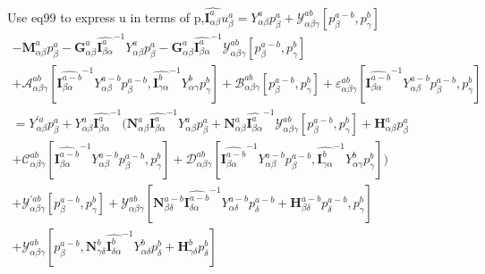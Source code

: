 \documentclass{Note}
\begin{document}
Use eq99 to express u in terms of p,$\widehat{\textbf{I}_{\alpha\beta}^a}  u_{\beta}^a=Y_{\alpha\beta}^a p_{\beta}^a+\mathcal{Y}_{\alpha\beta\gamma}^{ab}[p_{\beta}^{a-b},p_{\gamma}^{b}]$
 \begin{equation}
\begin{aligned}
-\textbf{M}_{\alpha\beta}^a p_\beta^a - \textbf{G}_{\alpha\beta}^a  {\widehat{\textbf{I}_{\beta \alpha}^a}}^{-1}  Y_{\alpha\beta}^a p_\beta^a- \textbf{G}_{\alpha\beta}^a  {\widehat{\textbf{I}_{\beta \alpha}^a}}^{-1} \mathcal{Y}_{\alpha\beta\gamma}^{ab}[p_{\beta}^{a-b},p_{\gamma}^{b}] \\
+\mathcal{A}_{\alpha\beta\gamma}^{ab}[{\widehat{\textbf{I}_{\beta \alpha}^{a-b}}}^{-1}  Y_{\alpha\beta}^{a-b} p_\beta^{a-b},{\widehat{\textbf{I}_{\gamma \alpha}^{b}}}^{-1}  Y_{\alpha\gamma}^{b} p_\gamma^{b}]+\mathcal{B}_{\alpha\beta\gamma}^{ab}[p_{\beta}^{a-b},p_{\gamma}^{b}]+\varepsilon_{\alpha\beta\gamma}^{ab}[{\widehat{\textbf{I}_{\beta \alpha}^{a-b}}}^{-1}  Y_{\alpha\beta}^{a-b} p_\beta^{a-b} ,p_{\gamma}^{b}]\\
={Y}_{\alpha\beta}^{'a} p_{\beta}^a 
+Y_{\alpha\beta}^{a} {\widehat{\textbf{I}_{\beta \alpha}^a}}^{-1}  (\textbf{N}_{\alpha\beta}^a   {\widehat{\textbf{I}_{\beta \alpha}^a}}^{-1}  Y_{\alpha\beta}^a p_\beta^a+\textbf{N}_{\alpha\beta}^a {\widehat{\textbf{I}_{\beta \alpha}^a}}^{-1} \mathcal{Y}_{\alpha\beta\gamma}^{ab}[p_{\beta}^{a-b},p_{\gamma}^{b}] +\textbf{H}_{\alpha\beta}^a p_\beta^a\\
+\mathcal{C}_{\alpha\beta\gamma}^{ab}[{\widehat{\textbf{I}_{\beta \alpha}^{a-b}}}^{-1}  Y_{\alpha\beta}^{a-b} p_\beta^{a-b} ,p_{\gamma}^{b}]+\mathcal{D}_{\alpha\beta\gamma}^{ab}[{\widehat{\textbf{I}_{\beta \alpha}^{a-b}}}^{-1}  Y_{\alpha\beta}^{a-b} p_\beta^{a-b},{\widehat{\textbf{I}_{\gamma \alpha}^{b}}}^{-1}  Y_{\alpha\gamma}^{b} p_\gamma^{b}])\\
+\mathcal{Y}_{\alpha\beta\gamma}^{'ab}[p_{\beta}^{a-b},p_{\gamma}^{b}]
+\mathcal{Y}_{\alpha\beta\gamma}^{ab}[\textbf{N}_{\beta\delta}^{a-b} {\widehat{\textbf{I}_{\delta \alpha}^{a-b}}}^{-1}  Y_{\alpha\delta}^{a-b} p_\delta^{a-b} +\textbf{H}_{\beta\delta}^{a-b} p_{\delta}^{a-b},p_{\gamma}^{b}]\\
+\mathcal{Y}_{\alpha\beta\gamma}^{ab}[p_\beta^{a-b},\textbf{N}_{\gamma\delta}^{b} {\widehat{\textbf{I}_{\delta \alpha}^{b}}}^{-1}  Y_{\alpha\delta}^{b} p_\delta^{b} +\textbf{H}_{\gamma\delta}^{b} p_{\delta}^{b}]\\
\end{aligned}
\end{equation}
\end{document}
